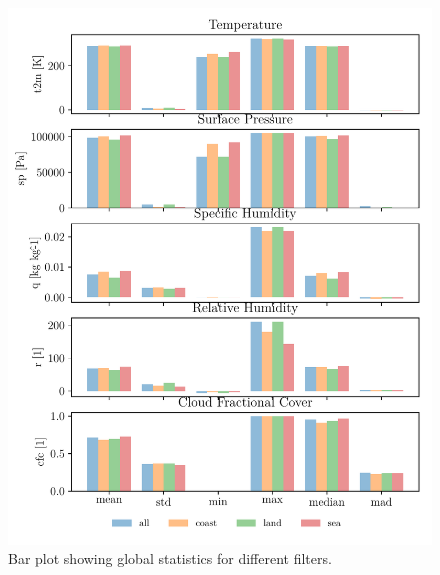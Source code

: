 \begin{figure}[ht]
    \centering
    \includegraphics{python_figs/bar_plot_global_statistics_new_legend.pdf}
    \caption{Bar plot showing global statistics for different filters.}
    \label{fig:bar_plot_global_stats}
\end{figure}

